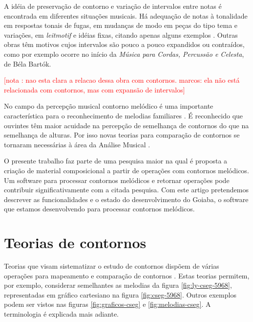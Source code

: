 \documentclass[brazil]{article}
\newcommand{\eng}[1]{\textit{#1}}
\newcommand{\opus}[1]{\textit{#1}}
\newcounter{notacounter}
\newcommand{\note}[1]{
  \addtocounter{notacounter}{1}
  \textcolor{red}{[nota \arabic{notacounter}: #1]}
}
\begin{document}
A idéia de preservação de contorno e variação de intervalos entre
notas é encontrada em diferentes situações musicais. Há adequação de
notas à tonalidade em respostas tonais de fugas, em mudanças de modo
em peças do tipo tema e variações, em \eng{leitmotif} e idéias fixas,
citando apenas alguns exemplos
\cite[p. 29]{morris87:composition}. Outras obras têm motivos cujos
intervalos são pouco a pouco expandidos ou contraídos, como por
exemplo ocorre no início da \opus{Música para Cordas, Percussão e
  Celesta}, de Béla Bartók. \note{nao esta clara a relacao dessa obra
  com contornos. marcos: ela não está relacionada com contornos, mas
  com expansão de intervalos}

No campo da percepção musical contorno melódico é uma importante
característica para o reconhecimento de melodias familiares \cite[p.
136]{dowling.ea86:music}. É reconhecido que ouvintes têm maior
acuidade na percepção de semelhança de contornos do que na semelhança
de alturas. Por isso novas teorias para comparação de contornos se
tornaram necessárias à área da Análise Musical
\cite[p. 226]{marvin.ea87:relating}.


O presente trabalho faz parte de uma pesquisa maior na qual é proposta
a criação de material composicional a partir de operações com
contornos melódicos. Um software para processar contornos melódicos e
retornar operações pode contribuir significativamente com a citada
pesquisa. Com este artigo pretendemos descrever as funcionalidades e o
estado do desenvolvimento do Goiaba, o software que estamos
desenvolvendo para processar contornos melódicos.

\section{Teorias de contornos}
\label{sec:teorias-de-contornos}

Teorias que visam sistematizar o estudo de contornos dispõem de várias
operações para mapeamento e comparação de contornos
\cite{friedmann85:methodology,friedmann87:response,morris87:composition,morris93:directions,marvin.ea87:relating,clifford95:contour,polansky.ea92:possible,quinn97:fuzzy,beard03:contour}. Estas
teorias permitem, por exemplo, considerar semelhantes as melodias da
figura \ref{fig:ly-cseg-5968}, representadas em gráfico cartesiano na
figura \ref{fig:cseg-5968}. Outros exemplos podem ser vistos nas
figuras \ref{fig:graficos-cseg} e \ref{fig:melodias-cseg}. A
terminologia é explicada mais adiante.
\end{document}
